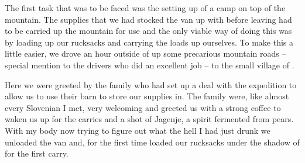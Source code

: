 The first task that was to be faced was the setting up of a camp on top
of the mountain. The supplies that we had stocked the van up with before
leaving  had to be carried up the mountain for use and the only
viable way of doing this was by loading up our rucksacks and carrying
the loads up ourselves. To make this a little easier, we drove an hour
outside of  up some precarious mountain roads -- special mention to
the drivers who did an excellent job -- to the small village of .


Here we were greeted by the family who had set up a deal with the
expedition to allow us to use their barn to store our supplies in. The
family were, like almost every Slovenian I met, very welcoming and
greeted us with a strong coffee to waken us up for the carries and a
shot of Jagenje, a spirit fermented from pears. With my body now trying
to figure out what the hell I had just drunk we unloaded the van and,
for the first time loaded our rucksacks under the shadow of  for
the first carry.


